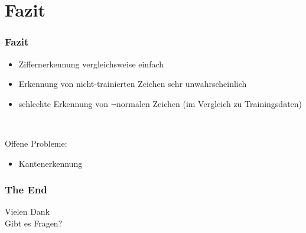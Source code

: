 \documentclass[14pt]{beamer}
\theoremstyle{remark}
\begin{document}
\section{Fazit}
\begin{frame}
	\frametitle{Fazit}
	\begin{itemize}
		\item Ziffernerkennung vergleichsweise einfach
		\item Erkennung von nicht-trainierten Zeichen sehr unwahrscheinlich
		\item schlechte Erkennung von \(\lnot\)normalen Zeichen (im Vergleich zu Trainingsdaten)
	\end{itemize}

	\mbox{ }

	Offene Probleme:
	\begin{itemize}
		\item Kantenerkennung
	\end{itemize}
\end{frame}


\begin{frame}
	\frametitle{The End}
	\begin{center}
		Vielen Dank\\[1ex]
		Gibt es Fragen?\\[5ex]
	\end{center}
\end{frame}
\end{document}
